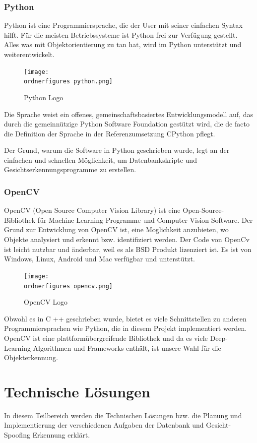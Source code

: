 \subsubsection{Python}
Python ist eine Programmiersprache, die der User mit seiner einfachen Syntax hilft. Für die meisten Betriebssysteme ist Python frei zur Verfügung gestellt. Alles was mit Objektorientierung zu tan hat, wird im Python unterstützt und weiterentwickelt.\\
\cite{pythonInfo}
\begin{figure}[ht]
	\centering
	\texttt{[image: \\ordnerfigures python.png]}
	\caption{ Python Logo}
	\label{fig:python}
	\cite{Pythonlogo}
\end{figure}
 Die Sprache weist ein offenes, gemeinschaftsbasiertes Entwicklungsmodell auf, das durch die gemeinnützige Python Software Foundation gestützt wird, die de facto die Definition der Sprache in der Referenzumsetzung CPython pflegt.

\bigbreak
Der Grund, warum die Software in Python geschrieben wurde, legt an der einfachen und schnellen Möglichkeit, um Datenbankskripte und Gesichtserkennungsprogramme zu erstellen.
\subsubsection{OpenCV}
OpenCV (Open Source Computer Vision Library) ist eine Open-Source-Bibliothek für Machine Learning Programme und Computer Vision Software. Der Grund zur Entwicklung von OpenCV ist, eine Moglichkeit anzubieten, wo Objekte analysiert und erkennt bzw. identifiziert werden. Der Code von OpenCv ist leicht nutzbar und änderbar, weil es als BSD Produkt lizenziert ist. Es ist von Windows, Linux, Android und Mac verfügbar und unterstützt.\cite{OpenCV1}
\begin{figure}[ht]
	\centering
	\texttt{[image: \\ordnerfigures opencv.png]}
	\caption{ OpenCV Logo}
	\label{fig:opencv}
	\cite{OpenCVlogo}
\end{figure}
\bigbreak
Obwohl es in C ++ geschrieben wurde, bietet es viele Schnittstellen zu anderen Programmiersprachen wie Python, die in diesem Projekt implementiert werden. OpenCV ist eine plattformübergreifende Bibliothek und da es viele Deep-Learning-Algorithmen und Frameworks enthält, ist unsere Wahl für die Objekterkennung.

\section{Technische Lösungen}
In diesem Teilbereich werden die Technischen Lösungen bzw. die Planung und Implementierung der verschiedenen Aufgaben der Datenbank und Gesicht-Spoofing Erkennung erklärt.
